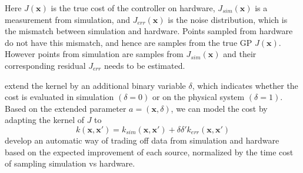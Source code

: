 Here $J(\pmb{x})$ is the true cost of the controller on hardware, $J_{sim}(\pmb{x})$ is a measurement from simulation, and $J_{err}(\pmb{x})$ is the noise distribution, which is the mismatch between simulation and hardware. Points sampled from hardware do not have this mismatch, and hence are samples from the true GP $J(\pmb{x})$. However points from simulation are samples from $J_{sim}(\pmb{x})$ and their corresponding residual $J_{err}$ needs to be estimated. 

\cite{poloczek2016multi} extend the kernel by an additional binary
variable $\delta$, which indicates whether the cost is evaluated in
simulation $(\delta = 0)$ or on the physical system $(\delta = 1)$. Based on the extended parameter $a = (\pmb{x}, \delta)$, we can model the cost
by adapting the kernel of $J$ to
\begin{equation}
    k(\pmb{x}, \pmb{x'}) = k_{sim}(\pmb{x}, \pmb{x'}) + \delta \delta' k_{err}(\pmb{x}, \pmb{x'})
\end{equation}
\cite{marco2017virtual} develop an automatic way of trading off data from simulation and hardware based on the expected improvement of each source, normalized by the time cost of sampling simulation vs hardware. 

 
 
 
 

